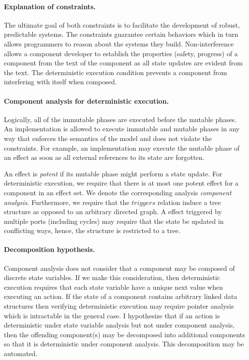\documentclass[letterpaper]{article}
\theoremstyle{definition} \newtheorem{constraint}{Constraint}
\begin{document}
\paragraph{Explanation of constraints.}
The ultimate goal of both constraints is to facilitate the development of robust, predictable systems.
The constraints guarantee certain behaviors which in turn allows programmers to reason about the systems they build.
Non-interference allows a component developer to establish the properties (safety, progress) of a component from the text of the component as all state updates are evident from the text.
The deterministic execution condition prevents a component from interfering with itself when composed.

\paragraph{Component analysis for deterministic execution.}
Logically, all of the immutable phases are executed before the mutable phases.
An implementation is allowed to execute immutable and mutable phases in any way that enforces the semantics of the model and does not violate the constraints.
For example, an implementation may execute the mutable phase of an effect as soon as all external references to its state are forgotten.

An effect is \emph{potent} if its mutable phase might perform a state update.
For deterministic execution, we require that there is at most one potent effect for a component in an effect set.
We denote the corresponding analysis \emph{component analysis}.
Furthermore, we require that the $triggers$ relation induce a tree structure as opposed to an arbitrary directed graph.
A effect triggered by multiple ports (including cycles) may require that the state be updated in conflicting ways, hence, the structure is restricted to a tree.

\paragraph{Decomposition hypothesis.}
Component analysis does not consider that a component may be composed of discrete state variables.
If we make this consideration, then deterministic execution requires that each state variable have a unique next value when executing an action.
If the state of a component contains arbitrary linked data structures then verifying deterministic execution may require pointer analysis which is intractable in the general case.
I hypothesize that if an action is deterministic under state variable analysis but not under component analysis, then the offending component(s) may be decomposed into additional components so that it is deterministic under component analysis.
This decomposition may be automated.
\end{document}
